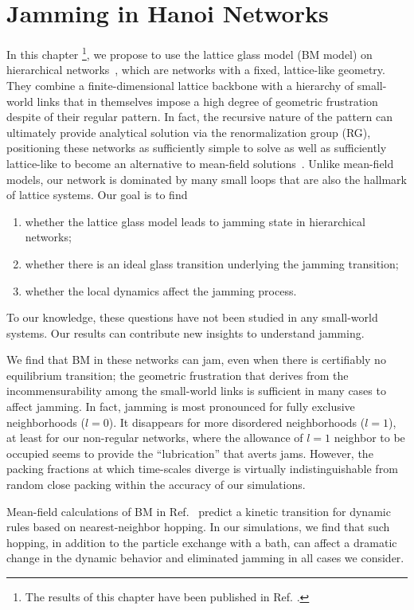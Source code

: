 
\chapter{Jamming in Hanoi Networks}
\label{chap-jamming}

In this chapter \footnote{The results of this chapter have been published in Ref. \cite{cheng2015jamming}.}, we propose to use the lattice glass model (BM model) on hierarchical
networks~\cite{Boettcher2008HN}, which are networks with a fixed,
lattice-like geometry. They combine a finite-dimensional lattice backbone
with a hierarchy of small-world links that in themselves impose a
high degree of geometric frustration despite of their regular pattern.
In fact, the recursive nature of the pattern can ultimately provide
analytical solution via the renormalization group (RG), positioning
these networks as sufficiently simple to solve as well as sufficiently
lattice-like to become an alternative to mean-field solutions~\cite{BoHa11}. 
Unlike mean-field models, our network is dominated by many small loops that are also the hallmark of lattice systems. Our goal is to find 
\begin{enumerate}
\item whether the lattice glass model leads to jamming
state in hierarchical networks;
\item whether there is an ideal glass
transition underlying the jamming transition;
\item whether the local dynamics affect the jamming process. 
\end{enumerate}
To our knowledge, these questions have not been studied in any small-world systems. Our results can contribute new insights to understand jamming.

We find that BM in these networks can jam, even when there is certifiably
no equilibrium transition; the geometric frustration that derives
from the incommensurability among the small-world links is sufficient
in many cases to affect jamming. In fact, jamming is most pronounced
for fully exclusive neighborhoods ($l=0$). It disappears for more
disordered neighborhoods ($l=1$), at least for our non-regular networks,
where the allowance of $l=1$ neighbor to be occupied seems to provide
the ``lubrication'' that averts jams. However, the packing fractions
at which time-scales diverge is virtually indistinguishable from random
close packing within the accuracy of our simulations. 

Mean-field calculations of BM in Ref.~\cite{Rivoire03} predict a kinetic transition for dynamic rules based on nearest-neighbor hopping. In our simulations, we find that  such hopping,  in addition to the particle exchange with a bath, can affect a dramatic change in the dynamic behavior and eliminated jamming in all cases we consider.  

